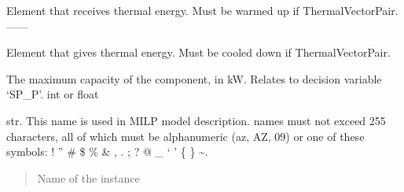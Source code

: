 \documentclass[letterpaper,10pt,english]{sphinxmanual}
\begin{document}
\begin{fulllineitems}
\begin{fulllineitems}
\end{fulllineitems}


\begin{fulllineitems}
\label{\detokenize{generated/tamos.production.CompHP:tamos.production.CompHP.energy_sink}}
\pysigstartsignatures
{}
\pysigstopsignatures
\sphinxAtStartPar
Element that receives thermal energy.
Must be warmed up if ThermalVectorPair.                ——\sphinxhyphen{}

\end{fulllineitems}


\begin{fulllineitems}
\label{\detokenize{generated/tamos.production.CompHP:tamos.production.CompHP.energy_source}}
\pysigstartsignatures
{}
\pysigstopsignatures
\sphinxAtStartPar
Element that gives thermal energy.
Must be cooled down if ThermalVectorPair.

\end{fulllineitems}


\begin{fulllineitems}
\label{\detokenize{generated/tamos.production.CompHP:tamos.production.CompHP.given_sizing}}
\pysigstartsignatures
{}
\pysigstopsignatures
\sphinxAtStartPar
The maximum capacity of the component, in kW.
Relates to decision variable ‘SP\_P’.
int or float

\end{fulllineitems}


\begin{fulllineitems}
\label{\detokenize{generated/tamos.production.CompHP:tamos.production.CompHP.name}}
\pysigstartsignatures
{}
\pysigstopsignatures
\sphinxAtStartPar
str.
This name is used in MILP model description.
names must not exceed 255 characters,
all of which must be alphanumeric (a\sphinxhyphen{}z, A\sphinxhyphen{}Z, 0\sphinxhyphen{}9) or one of these symbols:
! ” \# \$ \% \& , . ; ? @ \_ ‘ ’ \{ \} \textasciitilde{}.
\begin{quote}\begin{description}
\sphinxAtStartPar
Name of the instance


\end{description}
\end{quote}
\end{fulllineitems}
\end{fulllineitems}
\end{document}

